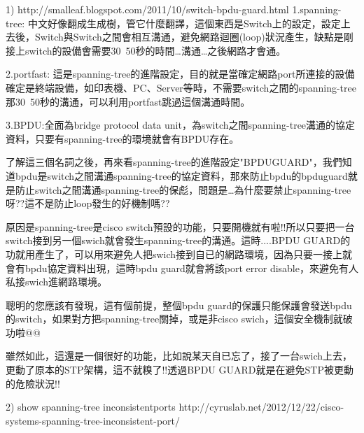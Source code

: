 1)  http://smalleaf.blogspot.com/2011/10/switch-bpdu-guard.html
1.spanning-tree: 中文好像翻成生成樹，管它什麼翻譯，這個東西是Switch上的設定，設定上去後，Switch與Switch之間會相互溝通，避免網路迴圈(loop)狀況產生，缺點是剛接上switch的設備會需要30~50秒的時間…溝通…之後網路才會通。

2.portfast: 這是spanning-tree的進階設定，目的就是當確定網路port所連接的設備確定是終端設備，如印表機、PC、Server等時，不需要switch之間的spanning-tree那30~50秒的溝通，可以利用portfast跳過這個溝通時間。

3.BPDU:全面為bridge protocol data unit，為switch之間spanning-tree溝通的協定資料，只要有spanning-tree的環境就會有BPDU存在。

了解這三個名詞之後，再來看spanning-tree的進階設定"BPDUGUARD"，我們知道bpdu是switch之間溝通spanning-tree的協定資料，那來防止bpdu的bpduguard就是防止switch之間溝通spanning-tree的保彪，問題是…為什麼要禁止spanning-tree呀??這不是防止loop發生的好機制嗎??

原因是spanning-tree是cisco switch預設的功能，只要開機就有啦!!所以只要把一台switch接到另一個swich就會發生spanning-tree的溝通。這時....BPDU GUARD的功就用產生了，可以用來避免人把swich接到自已的網路環境，因為只要一接上就會有bpdu協定資料出現，這時bpdu guard就會將該port error disable，來避免有人私接swich進網路環境。

聰明的您應該有發現，這有個前提，整個bpdu guard的保護只能保護會發送bpdu的switch，如果對方把spanning-tree關掉，或是非cisco swich，這個安全機制就破功啦@@

雖然如此，這還是一個很好的功能，比如說某天自已忘了，接了一台swich上去，更動了原本的STP架構，這不就糗了!!透過BPDU GUARD就是在避免STP被更動的危險狀況!!



2) show spanning-tree inconsistentports
http://cyruslab.net/2012/12/22/cisco-systems-spanning-tree-inconsistent-port/
